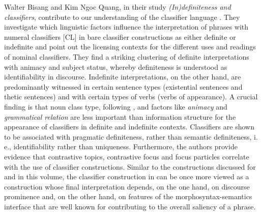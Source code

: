 \documentclass[output=paper]{langsci/langscibook}
\begin{document}
Walter Bisang and Kim Ngoc Quang, in their study {\emph{(In)definiteness and  classifiers}}, %
contribute to our understanding of the classifier language . They investigate which linguistic factors influence the interpretation of phrases with numeral classifiers [CL] in bare classifier constructions as either definite or indefinite and point out the licensing contexts for the different uses and readings of nominal classifiers. They find a striking clustering of definite interpretations with animacy and subject status, whereby definiteness is understood as identifiability in discourse. Indefinite interpretations, on the other hand, are predominantly witnessed in certain sentence types (existential sentences and thetic sentences) and with certain types of verbs (verbs of appearance). A crucial finding is that noun class type,  following \citet{lobner:85,lobner:11}, and factors like {\emph{animacy}} and {\emph{grammatical relation}} are less important than information structure for the appearance of classifiers in definite and indefinite contexts. Classifiers are shown to be associated with pragmatic definiteness, rather than semantic definiteness, i.\,e., identifiability rather than uniqueness. Furthermore, the authors provide evidence that contrastive topics, contrastive focus and focus particles correlate with the use of classifier constructions. Similar to the constructions discussed for  and  in this volume, the classifier construction in  can be once more viewed as a construction whose final interpretation depends, on the one hand, on discourse prominence and, on the other hand, on features of the morphosyntax-semantics interface that are well known for contributing to the overall saliency of a phrase.
													
\end{document}
